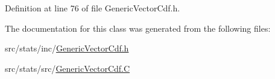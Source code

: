 Definition at line 76 of file Generic\-Vector\-Cdf.\-h.



The documentation for this class was generated from the following files\-:\begin{DoxyCompactItemize}
\item 
src/stats/inc/\hyperlink{_generic_vector_cdf_8h}{Generic\-Vector\-Cdf.\-h}\item 
src/stats/src/\hyperlink{_generic_vector_cdf_8_c}{Generic\-Vector\-Cdf.\-C}\end{DoxyCompactItemize}
